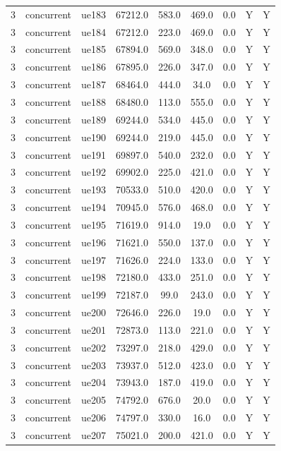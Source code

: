 \begin{table}[ht]
\begin{tabular}{|c|c|c|c|c|c|c|c|c|}
3 & concurrent & ue183 & 67212.0 & 583.0 & 469.0 & 0.0 & Y & Y \\
3 & concurrent & ue184 & 67212.0 & 223.0 & 469.0 & 0.0 & Y & Y \\
3 & concurrent & ue185 & 67894.0 & 569.0 & 348.0 & 0.0 & Y & Y \\
3 & concurrent & ue186 & 67895.0 & 226.0 & 347.0 & 0.0 & Y & Y \\
3 & concurrent & ue187 & 68464.0 & 444.0 & 34.0 & 0.0 & Y & Y \\
3 & concurrent & ue188 & 68480.0 & 113.0 & 555.0 & 0.0 & Y & Y \\
3 & concurrent & ue189 & 69244.0 & 534.0 & 445.0 & 0.0 & Y & Y \\
3 & concurrent & ue190 & 69244.0 & 219.0 & 445.0 & 0.0 & Y & Y \\
3 & concurrent & ue191 & 69897.0 & 540.0 & 232.0 & 0.0 & Y & Y \\
3 & concurrent & ue192 & 69902.0 & 225.0 & 421.0 & 0.0 & Y & Y \\
3 & concurrent & ue193 & 70533.0 & 510.0 & 420.0 & 0.0 & Y & Y \\
3 & concurrent & ue194 & 70945.0 & 576.0 & 468.0 & 0.0 & Y & Y \\
3 & concurrent & ue195 & 71619.0 & 914.0 & 19.0 & 0.0 & Y & Y \\
3 & concurrent & ue196 & 71621.0 & 550.0 & 137.0 & 0.0 & Y & Y \\
3 & concurrent & ue197 & 71626.0 & 224.0 & 133.0 & 0.0 & Y & Y \\
3 & concurrent & ue198 & 72180.0 & 433.0 & 251.0 & 0.0 & Y & Y \\
3 & concurrent & ue199 & 72187.0 & 99.0 & 243.0 & 0.0 & Y & Y \\
3 & concurrent & ue200 & 72646.0 & 226.0 & 19.0 & 0.0 & Y & Y \\
3 & concurrent & ue201 & 72873.0 & 113.0 & 221.0 & 0.0 & Y & Y \\
3 & concurrent & ue202 & 73297.0 & 218.0 & 429.0 & 0.0 & Y & Y \\
3 & concurrent & ue203 & 73937.0 & 512.0 & 423.0 & 0.0 & Y & Y \\
3 & concurrent & ue204 & 73943.0 & 187.0 & 419.0 & 0.0 & Y & Y \\
3 & concurrent & ue205 & 74792.0 & 676.0 & 20.0 & 0.0 & Y & Y \\
3 & concurrent & ue206 & 74797.0 & 330.0 & 16.0 & 0.0 & Y & Y \\
3 & concurrent & ue207 & 75021.0 & 200.0 & 421.0 & 0.0 & Y & Y \\

\end{tabular}
\end{table}
